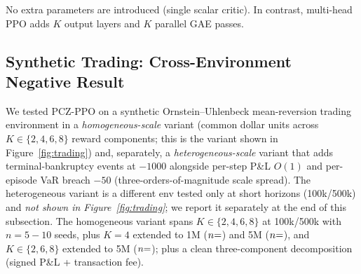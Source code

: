 \documentclass[11pt,a4paper]{article}
\DeclareRobustCommand{\cnum}[1]{\unskip}
\begin{document}
No extra parameters are introduced (single scalar critic). In contrast, multi-head PPO adds $K$ output layers and $K$ parallel GAE passes.

\subsection{Synthetic Trading: Cross-Environment Negative Result}
\label{app:gym_trading}
\label{sec:trading}

We tested PCZ-PPO on a synthetic Ornstein--Uhlenbeck mean-reversion trading environment in a \emph{homogeneous-scale} variant (common dollar units across $K{\in}\{2,4,6,8\}$ reward components; this is the variant shown in Figure~\ref{fig:trading}) and, separately, a \emph{heterogeneous-scale} variant that adds terminal-bankruptcy events at $-1000$ alongside per-step P\&L $O(1)$ and per-episode VaR breach $-50$ (three-orders-of-magnitude scale spread). The heterogeneous variant is a different env tested only at short horizons (100k/500k) and \emph{not shown in Figure~\ref{fig:trading}}; we report it separately at the end of this subsection. The homogeneous variant spans $K{\in}\{2,4,6,8\}$ at 100k/500k with $n{=}5{-}10$ seeds, plus $K{=}4$ extended to 1M ($n{=}\cnum{tv170_n}$) and 5M ($n{=}\cnum{tv172_n}$), and $K{\in}\{2,6,8\}$ extended to 5M ($n{=}\cnum{tv173_n}$); plus a clean three-component decomposition (signed P\&L + transaction fee).
\end{document}
